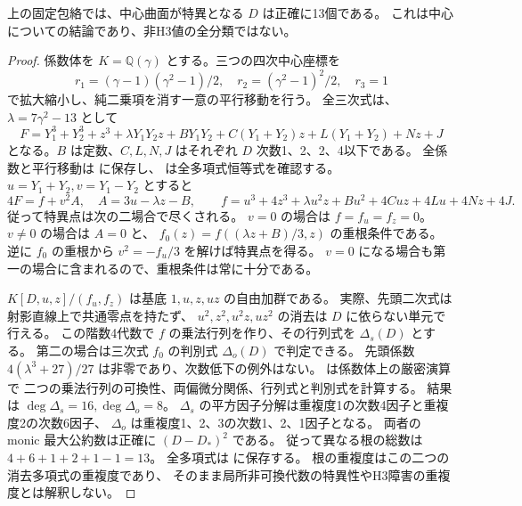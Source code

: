 \begin{proposition}[固定包絡の全ての特異中心値]
\label{prop:order4-center-critical-values}
上の固定包絡では、中心曲面が特異となる $D$ は正確に13個である。
これは中心についての結論であり、非H3値の全分類ではない。
\end{proposition}
\begin{proof}
係数体を $K=\mathbb Q(\gamma)$ とする。三つの四次中心座標を
\[
 r_1=(\gamma-1)(\gamma^2-1)/2,\quad
 r_2=(\gamma^2-1)^2/2,\quad r_3=1
\]
で拡大縮小し、純二乗項を消す一意の平行移動を行う。
全三次式は、$\lambda=7\gamma^2-13$ として
\[
 F=Y_1^3+Y_2^3+z^3+\lambda Y_1Y_2z+B Y_1Y_2
       +C(Y_1+Y_2)z+L(Y_1+Y_2)+Nz+J
\]
となる。$B$ は定数、$C,L,N,J$ はそれぞれ $D$ 次数1、2、2、4以下である。
全係数と平行移動は
 に保存し、
 は全多項式恒等式を確認する。
$u=Y_1+Y_2,v=Y_1-Y_2$ とすると
\[
 4F=f+v^2 A,\quad A=3u-\lambda z-B,\qquad
 f=u^3+4z^3+\lambda u^2z+Bu^2+4Cuz+4Lu+4Nz+4J.
\]
従って特異点は次の二場合で尽くされる。
$v=0$ の場合は $f=f_u=f_z=0$。
$v\ne0$ の場合は $A=0$ と、
$f_0(z)=f((\lambda z+B)/3,z)$ の重根条件である。
逆に $f_0$ の重根から $v^2=-f_u/3$ を解けば特異点を得る。
$v=0$ になる場合も第一の場合に含まれるので、重根条件は常に十分である。

$K[D,u,z]/(f_u,f_z)$ は基底 $1,u,z,uz$ の自由加群である。
実際、先頭二次式は射影直線上で共通零点を持たず、
$u^2,z^2,u^2z,uz^2$ の消去は $D$ に依らない単元で行える。
この階数4代数で $f$ の乗法行列を作り、その行列式を $\Delta_s(D)$ とする。
第二の場合は三次式 $f_0$ の判別式 $\Delta_o(D)$ で判定できる。
先頭係数 $4(\lambda^3+27)/27$ は非零であり、次数低下の例外はない。
 は係数体上の厳密演算で
二つの乗法行列の可換性、両偏微分関係、行列式と判別式を計算する。
結果は $\deg\Delta_s=16,\deg\Delta_o=8$。
$\Delta_s$ の平方因子分解は重複度1の次数4因子と重複度2の次数6因子、
$\Delta_o$ は重複度1、2、3の次数1、2、1因子となる。
両者の monic 最大公約数は正確に $(D-D_*)^2$ である。
従って異なる根の総数は $4+6+1+2+1-1=13$。
全多項式は  に保存する。
根の重複度はこの二つの消去多項式の重複度であり、
そのまま局所非可換代数の特異性やH3障害の重複度とは解釈しない。
\end{proof}
